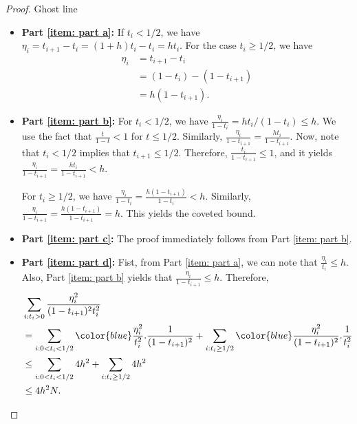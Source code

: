 \documentclass{article}
\theoremstyle{plain}
\theoremstyle{definition}
\theoremstyle{remark}
\newcommand{\blue}[1]{{\color{blue}#1}}
\begin{document}
\begin{proof}
{\color{white} Ghost line}
\begin{itemize}
    \item \textbf{Part \ref{item: part a}:} If $t_i < 1/2$, we have $\eta_i = t_{i+1} - t_i = (1+h)t_i - t_i = h t_i$. For the case $t_{i}\ge 1/2$, we have 
    \begin{align*}
        \eta_i &= t_{i+1} - t_i\\
        & = (1- t_i) - (1 - t_{i+1})\\
        & = h (1- t_{i+1}).
    \end{align*}

    \item \textbf{Part \ref{item: part b}:} For $t_i < 1/2$, we have $\frac{\eta_i}{1 - t_i} = ht_i/(1-t_i) \le h$. We use the fact that $\frac{t}{1-t}<1$ for $t \le 1/2$. Similarly, $\frac{\eta_i}{1 - t_{i+1}} = \frac{h t_i}{1 - t_{i+1}}$. Now, note that $t_i <1/2$ implies that $t_{i+1} \le 1/2$. Therefore, $\frac{t_i}{1 - t_{i+1}}\le 1$, and it yields $\frac{\eta_i}{1 - t_{i+1}} = \frac{h t_i}{1 - t_{i+1}} < h$.
    
    For $t_i\ge 1/2$, we have $\frac{\eta_i}{1-t_i} = \frac{h(1- t_{i+1})}{1 - t_i} < h$. Similarly, $\frac{\eta_i}{1-t_{i+1}} = \frac{h(1- t_{i+1})}{1 - t_{i+1}} = h$. This yields the coveted bound.

    \item \textbf{Part \ref{item: part c}:} The proof immediately follows from Part \ref{item: part b}.


    \item \textbf{Part \ref{item: part d}:} Fist, from Part \ref{item: part a}, we can note that $\frac{\eta_{i}}{t_i} \le h$. Also, Part \ref{item: part b} yields that $\frac{\eta_i}{1 - t_{i+1}} \le h$. Therefore, 
    \begin{align*}
        & \sum_{i : t_i >0}\frac{ \eta_i^2 }{(1-t_{i+1})^2 t_i^2}\\
        & = \sum_{i: 0 < t_{i} < 1/2 } \blue{\frac{ \eta_i^2 }{ t_i^2}}. \frac{1}{(1-t_{i+1})^2} + \sum_{i: t_{i}\ge 1/2 } \blue{\frac{ \eta_i^2 }{(1-t_{i+1})^2 }}. \frac{1}{t_i^2} \\
        & \le \sum_{i: 0 < t_{i} < 1/2 } 4 h^2 + \sum_{i: t_{i}\ge 1/2 } 4 h^2\\
        & \le 4h^2 N.
    \end{align*}
\end{itemize}
    

    


    


\end{proof}
\end{document}
